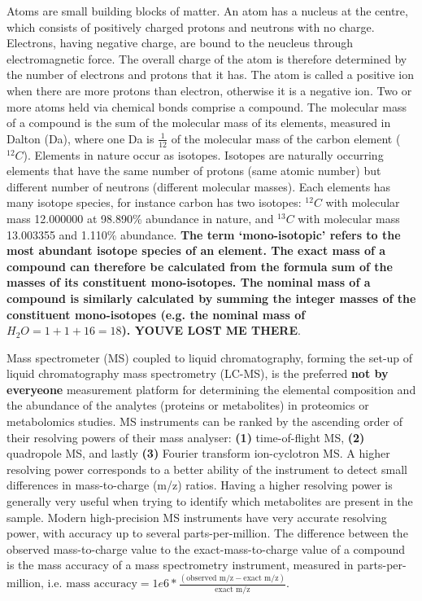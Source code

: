 Atoms are small building blocks of matter. An atom has a nucleus at the centre, which consists of positively charged protons and neutrons with no charge. Electrons, having negative charge, are bound to the neucleus through electromagnetic force. The overall charge of the atom is therefore determined by the number of electrons and protons that it has. The atom is called a positive ion when there are more protons than electron, otherwise it is a negative ion. Two or more atoms held via chemical bonds comprise a compound. The molecular mass of a compound is the sum of the molecular mass of its elements, measured in Dalton (Da), where one Da is $\frac{1}{12}$ of the molecular mass of the carbon element ($^{12}C$). Elements in nature occur as isotopes. Isotopes are naturally occurring elements that have the same number of protons (same atomic number) but different number of neutrons (different molecular masses). Each elements has many isotope species, for instance carbon has two isotopes: $^{12}C$ with molecular mass 12.000000 at 98.890\% abundance in nature, and $^{13}C$ with molecular mass 13.003355 and 1.110\% abundance. \textbf{The term `mono-isotopic' refers to the most abundant isotope species of an element. The exact mass of a compound can therefore be calculated from the formula sum of the masses of its constituent mono-isotopes. The nominal mass of a compound is similarly calculated by summing the integer masses of the constituent mono-isotopes (e.g. the nominal mass of $H_2O=1+1+16=18$). YOUVE LOST ME THERE}.

Mass spectrometer (MS) coupled to liquid chromatography, forming the set-up of liquid chromatography mass spectrometry (LC-MS), is the preferred \textbf{not by everyeone} measurement platform for determining the elemental composition and the abundance of the analytes (proteins or metabolites) in proteomics or metabolomics studies. MS instruments can be ranked by the ascending order of their resolving powers of their mass analyser: \textbf{(1)} time-of-flight MS, \textbf{(2)} quadropole MS, and lastly \textbf{(3)} Fourier transform ion-cyclotron MS. A higher resolving power corresponds to a better ability of the instrument to detect small differences in mass-to-charge (m/z) ratios. Having a higher resolving power is generally very useful when trying to identify which metabolites are present in the sample. Modern high-precision MS instruments have very accurate resolving power, with accuracy up to several parts-per-million. The difference between the observed mass-to-charge value to the exact-mass-to-charge value of a compound is the mass accuracy of a mass spectrometry instrument, measured in parts-per-million, i.e. $\text{mass accuracy} = 1e6 * \frac{(\text{observed m/z} - \text{exact m/z})}{\text{exact m/z}}$. 

